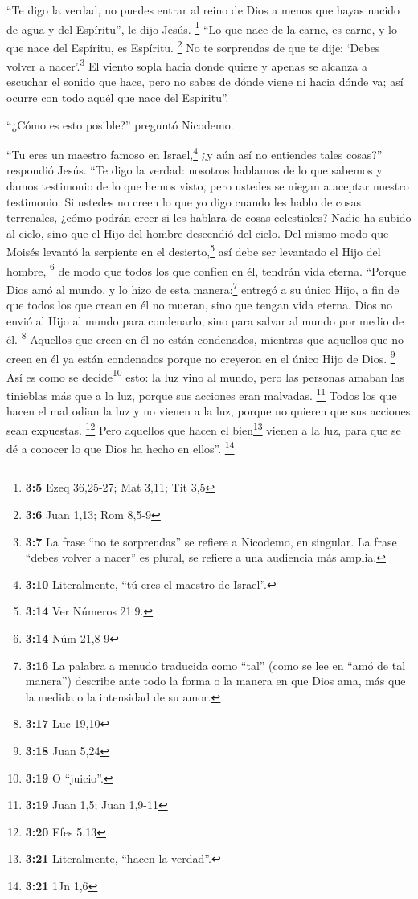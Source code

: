  ``Te digo la verdad, no puedes entrar al reino de Dios a
menos que hayas nacido de agua y del Espíritu'', le dijo Jesús.
\footnote{\textbf{3:5} Ezeq 36,25-27; Mat 3,11; Tit 3,5} 
``Lo que nace de la carne, es carne, y lo que nace del Espíritu, es
Espíritu. \footnote{\textbf{3:6} Juan 1,13; Rom 8,5-9}  No
te sorprendas de que te dije: `Debes volver a nacer'.\footnote{\textbf{3:7}
  La frase ``no te sorprendas'' se refiere a Nicodemo, en singular. La
  frase ``debes volver a nacer'' es plural, se refiere a una audiencia
  más amplia.}  El viento sopla hacia donde quiere y
apenas se alcanza a escuchar el sonido que hace, pero no sabes de dónde
viene ni hacia dónde va; así ocurre con todo aquél que nace del
Espíritu''.

 ``¿Cómo es esto posible?'' preguntó Nicodemo.

 ``Tu eres un maestro famoso en Israel,\footnote{\textbf{3:10}
  Literalmente, ``tú eres el maestro de Israel''.} ¿y aún así no
entiendes tales cosas?'' respondió Jesús.  ``Te digo la
verdad: nosotros hablamos de lo que sabemos y damos testimonio de lo que
hemos visto, pero ustedes se niegan a aceptar nuestro testimonio.
 Si ustedes no creen lo que yo digo cuando les hablo de
cosas terrenales, ¿cómo podrán creer si les hablara de cosas
celestiales?  Nadie ha subido al cielo, sino que el Hijo
del hombre descendió del cielo.  Del mismo modo que
Moisés levantó la serpiente en el desierto,\footnote{\textbf{3:14} Ver
  Números 21:9.} así debe ser levantado el Hijo del hombre, \footnote{\textbf{3:14}
  Núm 21,8-9}  de modo que todos los que confíen en él,
tendrán vida eterna.  ``Porque Dios amó al mundo, y lo
hizo de esta manera:\footnote{\textbf{3:16} La palabra a menudo
  traducida como ``tal'' (como se lee en ``amó de tal manera'') describe
  ante todo la forma o la manera en que Dios ama, más que la medida o la
  intensidad de su amor.} entregó a su único Hijo, a fin de que todos
los que crean en él no mueran, sino que tengan vida eterna.
 Dios no envió al Hijo al mundo para condenarlo, sino
para salvar al mundo por medio de él. \footnote{\textbf{3:17} Luc 19,10}
 Aquellos que creen en él no están condenados, mientras
que aquellos que no creen en él ya están condenados porque no creyeron
en el único Hijo de Dios. \footnote{\textbf{3:18} Juan 5,24}
 Así es como se decide\footnote{\textbf{3:19} O
  ``juicio''.} esto: la luz vino al mundo, pero las personas amaban las
tinieblas más que a la luz, porque sus acciones eran malvadas.
\footnote{\textbf{3:19} Juan 1,5; Juan 1,9-11}  Todos los
que hacen el mal odian la luz y no vienen a la luz, porque no quieren
que sus acciones sean expuestas. \footnote{\textbf{3:20} Efes 5,13}
 Pero aquellos que hacen el bien\footnote{\textbf{3:21}
  Literalmente, ``hacen la verdad''.} vienen a la luz, para que se dé a
conocer lo que Dios ha hecho en ellos''. \footnote{\textbf{3:21} 1Jn 1,6}


